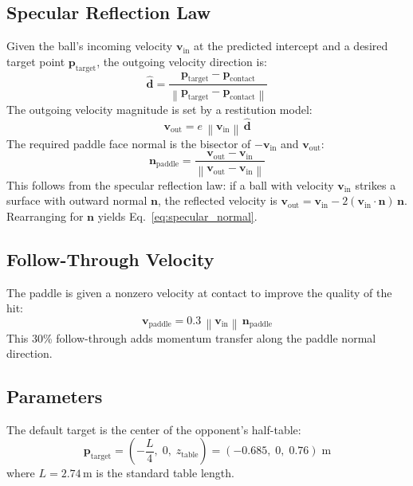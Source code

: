 \documentclass[11pt,letterpaper]{article}
\newcommand{\vv}[1]{\mathbf{#1}}
\newcommand{\norm}[1]{\left\|#1\right\|}
\begin{document}
\subsection{Specular Reflection Law}

Given the ball's incoming velocity $\vv{v}_{\text{in}}$ at the predicted intercept and a desired target point $\vv{p}_{\text{target}}$, the outgoing velocity direction is:
\begin{equation}
    \hat{\vv{d}} = \frac{\vv{p}_{\text{target}} - \vv{p}_{\text{contact}}}{\norm{\vv{p}_{\text{target}} - \vv{p}_{\text{contact}}}}
\end{equation}
The outgoing velocity magnitude is set by a restitution model:
\begin{equation}
    \vv{v}_{\text{out}} = e\,\norm{\vv{v}_{\text{in}}}\,\hat{\vv{d}}
\end{equation}
The required paddle face normal is the bisector of $-\vv{v}_{\text{in}}$ and $\vv{v}_{\text{out}}$:
\begin{equation}
    \vv{n}_{\text{paddle}} = \frac{\vv{v}_{\text{out}} - \vv{v}_{\text{in}}}{\norm{\vv{v}_{\text{out}} - \vv{v}_{\text{in}}}}
    \label{eq:specular_normal}
\end{equation}
This follows from the specular reflection law: if a ball with velocity $\vv{v}_{\text{in}}$ strikes a surface with outward normal $\vv{n}$, the reflected velocity is $\vv{v}_{\text{out}} = \vv{v}_{\text{in}} - 2(\vv{v}_{\text{in}} \cdot \vv{n})\,\vv{n}$.  Rearranging for $\vv{n}$ yields Eq.~\eqref{eq:specular_normal}.

\subsection{Follow-Through Velocity}

The paddle is given a nonzero velocity at contact to improve the quality of the hit:
\begin{equation}
    \vv{v}_{\text{paddle}} = 0.3\,\norm{\vv{v}_{\text{in}}}\,\vv{n}_{\text{paddle}}
\end{equation}
This 30\% follow-through adds momentum transfer along the paddle normal direction.

\subsection{Parameters}

The default target is the center of the opponent's half-table:
\begin{equation}
    \vv{p}_{\text{target}} = \left(-\frac{L}{4},\; 0,\; z_{\text{table}}\right) = (-0.685,\; 0,\; 0.76)\;\text{m}
\end{equation}
where $L = 2.74$\,m is the standard table length.
\end{document}
